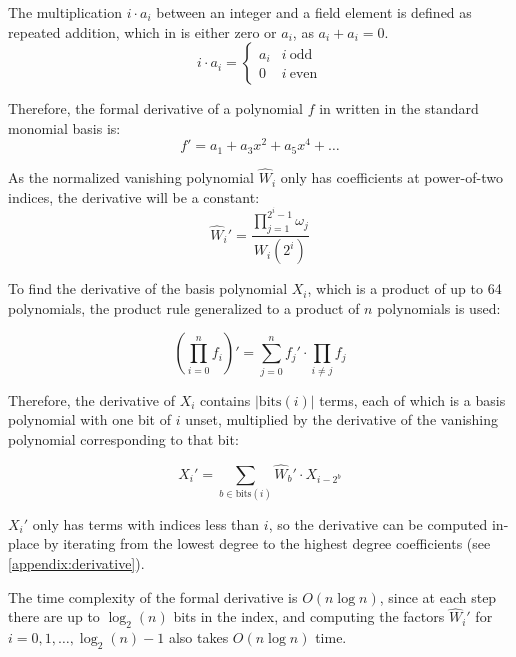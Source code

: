 The multiplication $i \cdot a_i$ between an integer and a field element is defined as repeated addition, which in  is either zero or $a_i$, as $a_i + a_i = 0$.
\begin{equation}
i \cdot a_i =
    \begin{cases}
        a_i & i\ \text{odd} \\
        0 & i\ \text{even}
    \end{cases}
\end{equation}

Therefore, the formal derivative of a polynomial $f$ in  written in the standard monomial basis is:
\begin{equation}f' = a_1 + a_3 x^2 + a_5 x^4 + \ldots\end{equation}

As the normalized vanishing polynomial $\hat{W}_i$ only has coefficients at power-of-two indices, the derivative will be a constant:
\begin{equation}\hat{W}_i' = \frac{\prod_{j = 1}^{2^i - 1} \omega_j}{W_i(2^i)}\end{equation}

To find the derivative of the basis polynomial $X_i$, which is a product of up to 64 polynomials, the product rule generalized to a product of $n$ polynomials is used:

\begin{equation}
(\prod_{i = 0}^{n} f_i)' = \sum_{j = 0}^{n} f_j' \cdot \prod_{i \neq j} f_j
\end{equation}

Therefore, the derivative of $X_i$ contains $|\text{bits}(i)|$ terms, each of which is a basis polynomial with one bit of $i$ unset, multiplied by the derivative of the vanishing polynomial corresponding to that bit:

\begin{equation}
X_i' = \sum_{b \in \text{bits}(i)} \hat{W}_b' \cdot X_{i - 2^b}
\end{equation}

$X_i'$ only has terms with indices less than $i$, so the derivative can be computed in-place by iterating from the lowest degree to the highest degree coefficients (see \ref{appendix:derivative}).

The time complexity of the formal derivative is $O(n \log n)$, since at each step there are up to $\log_2(n)$ bits in the index, and computing the factors $\hat{W}_i'$ for $i = 0, 1, \ldots, \log_2(n) - 1$ also takes $O(n \log n)$ time.

